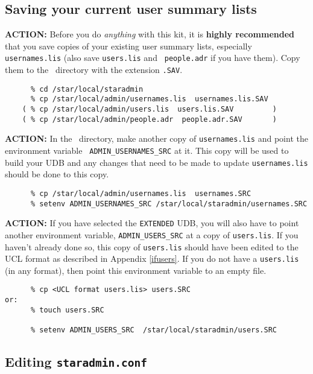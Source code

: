 \subsection{Saving your current user summary lists}

{\large\bf ACTION:} Before you do {\it anything} with this kit, it is {\bf
highly recommended} that you save copies of your existing user summary
lists, especially {\tt usernames.lis} (also save {\tt users.lis} and {\tt
people.adr} if you have them). Copy them to the \staradmin\ directory with
the extension {\tt .SAV}. 

\begin{verbatim}
      % cd /star/local/staradmin
      % cp /star/local/admin/usernames.lis  usernames.lis.SAV
    ( % cp /star/local/admin/users.lis  users.lis.SAV         )
    ( % cp /star/local/admin/people.adr  people.adr.SAV       )
\end{verbatim}

{\large\bf ACTION:} In the \staradmin\ directory, make another copy of
{\tt usernames.lis} and point the environment variable {\tt
ADMIN\_USERNAMES\_SRC} at it. This copy will be used to build your UDB and
any changes that need to be made to update {\tt usernames.lis} should be
done to this copy. 

\begin{verbatim}
      % cp /star/local/admin/usernames.lis  usernames.SRC
      % setenv ADMIN_USERNAMES_SRC /star/local/staradmin/usernames.SRC
\end{verbatim}

{\large\bf ACTION:} If you have selected the {\tt EXTENDED} UDB, you will
also have to point another environment variable, {\tt ADMIN\_USERS\_SRC}
at a copy of {\tt users.lis}. If you haven't already done so, this copy of
{\tt users.lis} should have been edited to the UCL format as described in
Appendix \ref{ifusers}. If you do not have a {\tt users.lis} (in any
format), then point this environment variable to an empty file. 

\begin{verbatim}
      % cp <UCL format users.lis> users.SRC
or:  
      % touch users.SRC

      % setenv ADMIN_USERS_SRC  /star/local/staradmin/users.SRC
\end{verbatim}


\subsection{Editing {\tt staradmin.conf}}

